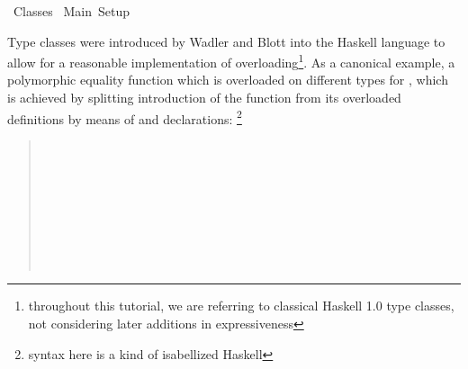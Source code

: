 %
\begin{isabellebody}%
\def\isabellecontext{Classes}%
%
\isadelimtheory
%
\endisadelimtheory
%
\isatagtheory
{}\isamarkupfalse%
\ Classes\isanewline
{}\ Main\ Setup\isanewline
{}%
\endisatagtheory
{\isafoldtheory}%
%
\isadelimtheory
%
\endisadelimtheory
%
\isamarkuptrue%
%
\begin{isamarkuptext}%
Type classes were introduced by Wadler and Blott \cite{wadler89how}
  into the Haskell language to allow for a reasonable implementation
  of overloading\footnote{throughout this tutorial, we are referring
  to classical Haskell 1.0 type classes, not considering later
  additions in expressiveness}.  As a canonical example, a polymorphic
  equality function  which is overloaded on
  different types for \isa{{\isasymalpha}}, which is achieved by splitting
  introduction of the  function from its overloaded
  definitions by means of  and 
  declarations: \footnote{syntax here is a kind of isabellized
  Haskell}

  \begin{quote}

  \noindent{} \\
  \hspace*{2ex}

  \medskip\noindent{} \\
  \hspace*{2ex} \\
  \hspace*{2ex} \\
  \hspace*{2ex} \\
  \hspace*{2ex}

  \medskip\noindent{} \\
  \hspace*{2ex}


\end{quote}
\end{isamarkuptext}
\end{isabellebody}
